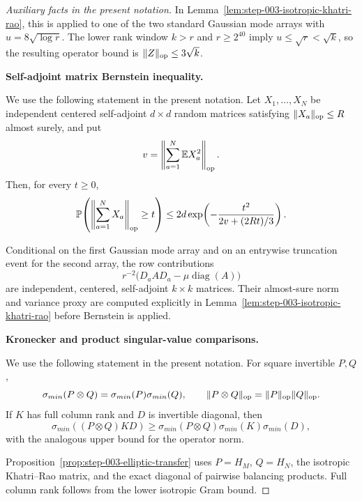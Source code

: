 \begin{proof}[Auxiliary facts in the present notation]
In
Lemma~\ref{lem:step-003-isotropic-khatri-rao}, this is applied to one of the
two standard Gaussian mode arrays with \(u=8\sqrt{\log r}\). The lower rank
window \(k>r\) and \(r\ge2^{40}\) imply
\(u\le\sqrt r<\sqrt k\), so the resulting operator bound is
\(\|Z\|_{\rm op}\le3\sqrt k\).


\medskip\noindent\textbf{Self-adjoint matrix Bernstein inequality.}\par

We use the following statement in the present notation. Let \(X_1,\ldots,X_N\) be independent centered
self-adjoint \(d\times d\) random matrices satisfying
\(\|X_a\|_{\rm op}\le R\) almost surely, and put
\[
  v=\left\|\sum_{a=1}^N\mathbb E X_a^2\right\|_{\rm op}.
\]
Then, for every \(t\ge0\),
\[
  \mathbb P\!\left(
    \left\|\sum_{a=1}^N X_a\right\|_{\rm op}\ge t
  \right)
  \le 2d\exp\!\left(-\frac{t^2}{2v+(2Rt)/3}\right).
\]

Conditional on the first Gaussian
mode array and on an entrywise truncation event for the second array, the
row contributions
\[
  r^{-2}\bigl(D_a A D_a-\mu\operatorname{diag}(A)\bigr)
\]
are independent, centered, self-adjoint \(k\times k\) matrices. Their
almost-sure norm and variance proxy are computed explicitly in
Lemma~\ref{lem:step-003-isotropic-khatri-rao} before Bernstein is applied.


\medskip\noindent\textbf{Kronecker and product singular-value comparisons.}\par

We use the following statement in the present notation. For square invertible \(P,Q\),
\[
  \sigma_{min}(P\otimes Q)
    =\sigma_{min}(P)\sigma_{min}(Q),\qquad
  \|P\otimes Q\|_{\rm op}=\|P\|_{\rm op}\|Q\|_{\rm op}.
\]
If \(K\) has full column rank and \(D\) is invertible diagonal, then
\[
  \sigma_{min}((P\otimes Q)KD)
  \ge\sigma_{min}(P\otimes Q)\sigma_{min}(K)\sigma_{min}(D),
\]
with the analogous upper bound for the operator norm.

Proposition~\ref{prop:step-003-elliptic-transfer}
uses \(P=H_M\), \(Q=H_N\), the isotropic Khatri--Rao matrix, and the exact
diagonal of pairwise balancing products. Full column rank follows from the
lower isotropic Gram bound.

\end{proof}



